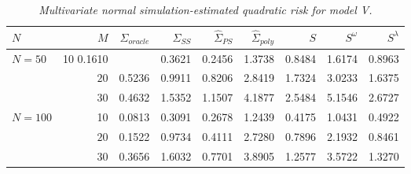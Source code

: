 \begin{table}[H]
\centering
\caption{\textit{Multivariate normal simulation-estimated quadratic risk  for model V.} }
\begin{tabular}{lrrrrrrrr}
 $N$ & $M$ &$\hat{\Sigma}_{oracle}$& $\hat{\Sigma}_{SS}$& $\hat{\Sigma}_{PS}$ & $\hat{\Sigma}_{poly}$ & $S$ &$S^\omega$& $S^\lambda$ \\ 
  \hline
   $N = 50$ & 10   0.1610 & & 0.3621 & 0.2456 & 1.3738 & 0.8484 & 1.6174 & 0.8963 \\ 
     		& $20$ & 0.5236 & 0.9911 & 0.8206 &  2.8419 & 1.7324 & 3.0233 & 1.6375 \\ 
     		& $30$ & 0.4632 & 1.5352 & 1.1507 & 4.1877 & 2.5484 & 5.1546 & 2.6727 \\ 
  $N = 100$ & 10 &  0.0813 & 0.3091 & 0.2678 & 1.2439 & 0.4175 & 1.0431 & 0.4922 \\ 
     		 & $20$ &0.1522 & 0.9734 & 0.4111 &  2.7280 & 0.7896 & 2.1932 & 0.8461 \\ 
     & $30$ &0.3656 & 1.6032 & 0.7701 &  3.8905 & 1.2577 & 3.5722 & 1.3270 \\ 
   \hline
\end{tabular}
\label{table:simulation-1-quad-loss-sigma-5}
\end{table}
%


